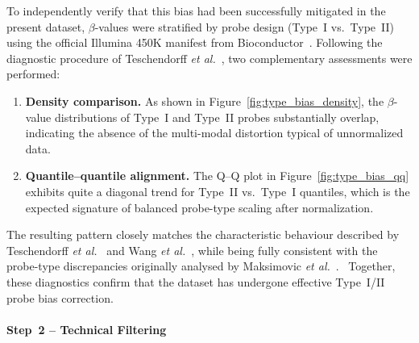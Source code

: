 \documentclass[10pt]{extarticle}
\newcommand{\good}[1]{\textcolor{teal!70!black}{\ding{51}~#1}}
\begin{document}
To independently verify that this bias had been successfully mitigated in the present dataset, $\beta$-values were
stratified by probe design (Type~I vs.~Type~II) using the official Illumina 450K manifest
from Bioconductor~\cite{Illumina450kAnno}.  
Following the diagnostic procedure of Teschendorff \textit{et al.}~\cite{Teschendorff2013BMIQ}, two complementary
assessments were performed:

\begin{enumerate}
    \item \textbf{Density comparison.}  
    As shown in Figure~\ref{fig:type_bias_density}, the $\beta$-value distributions of Type~I and Type~II probes
    substantially overlap, indicating the absence of the multi-modal distortion typical of unnormalized data.
    \item \textbf{Quantile--quantile alignment.}  
    The Q--Q plot in Figure~\ref{fig:type_bias_qq} exhibits quite a diagonal trend for Type~II vs.~Type~I
    quantiles, which is the expected signature of balanced probe-type scaling after normalization.
\end{enumerate}

The resulting pattern closely matches the characteristic behaviour described by Teschendorff
\textit{et al.}~\cite{Teschendorff2013BMIQ} and Wang \textit{et al.}~\cite{Wang2015Normalization450K}, while being fully
consistent with the probe-type discrepancies originally analysed by Maksimovic \textit{et al.}~\cite{Maksimovic2012}.  
\good{Together, these diagnostics confirm that the dataset has undergone effective Type~I/II probe bias correction.}



\paragraph{Step~2 -- Technical Filtering}
\label{par:gse69914_step2}
\end{document}
